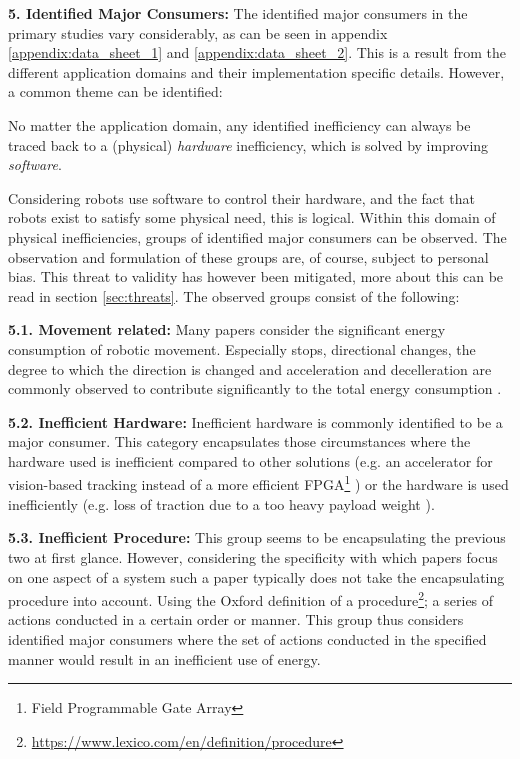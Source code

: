 \noindent\textbf{5. Identified Major Consumers:}
The identified major consumers in the primary studies vary considerably, as can be seen in appendix \ref{appendix:data_sheet_1} and \ref{appendix:data_sheet_2}.
This is a result from the different application domains and their implementation specific details.
However, a common theme can be identified:

No matter the application domain, any identified inefficiency can always be traced back to a (physical) \textit{hardware} inefficiency, 
which is solved by improving \textit{software}.

Considering robots use software to control their hardware, and the fact that robots exist to satisfy some physical need, this is logical.
Within this domain of physical inefficiencies, groups of identified major consumers can be observed.
The observation and formulation of these groups are, of course, subject to personal bias.
This threat to validity has however been mitigated, more about this can be read in section \ref{sec:threats}.
The observed groups consist of the following:

\vspace{2mm} \noindent \textbf{5.1. Movement related:}
Many papers consider the significant energy consumption of robotic movement. 
Especially stops, directional changes, the degree to which the direction is changed and acceleration and decelleration are commonly observed
to contribute significantly to the total energy consumption 
\cite{mei2005energy_consumers_identified, mei2006mobile_exploration, xie2018mecanum_wheel,kaitwanidvilai2020industrial_robot_cycle_time}.

\vspace{2mm} \noindent \textbf{5.2. Inefficient Hardware:}
Inefficient hardware is commonly identified to be a major consumer. 
This category encapsulates those circumstances where the hardware used is inefficient compared to other solutions 
(e.g. an accelerator for vision-based tracking instead of a more efficient FPGA\footnote{Field Programmable Gate Array} \cite{cheng2018FPGA_image_recognition})
or the hardware is used inefficiently (e.g. loss of traction due to a too heavy payload weight \cite{kim2016firefighting_robot}).

\vspace{2mm} \noindent \textbf{5.3. Inefficient Procedure:}
This group seems to be encapsulating the previous two at first glance. 
However, considering the specificity with which papers focus on one aspect of a system such a paper typically does not take the encapsulating procedure into account.
Using the Oxford definition of a procedure\footnote{\url{https://www.lexico.com/en/definition/procedure}}; a series of actions conducted in a certain order or manner.
This group thus considers identified major consumers where the set of actions conducted in the specified manner would result in an inefficient use of energy.


